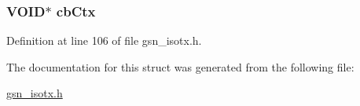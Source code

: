 \hypertarget{a00101_abc1717c5357c7dda5c2abef096a06f1f}{
\subsubsection[{cbCtx}]{\setlength{\rightskip}{0pt plus 5cm}VOID$\ast$ {\bf cbCtx}}}
\label{a00101_abc1717c5357c7dda5c2abef096a06f1f}


Definition at line 106 of file gsn\_\-isotx.h.



The documentation for this struct was generated from the following file:\begin{DoxyCompactItemize}
\item 
\hyperlink{a00520}{gsn\_\-isotx.h}\end{DoxyCompactItemize}
